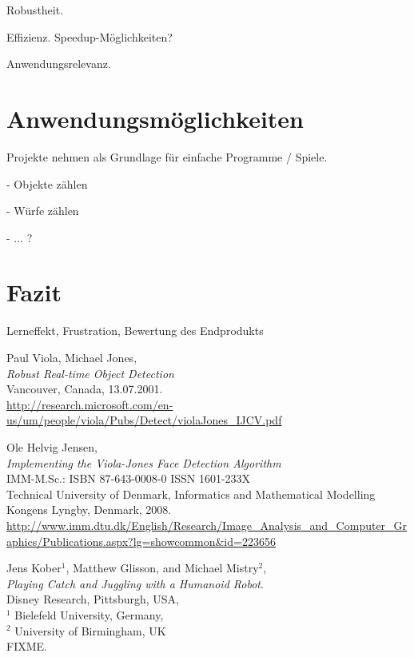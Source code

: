 \documentclass[12pt,a4paper,ngerman]{scrartcl}
\begin{document}
Robustheit.

Effizienz. Speedup-Möglichkeiten?

Anwendungsrelevanz.

\section{Anwendungsmöglichkeiten}

Projekte nehmen als Grundlage für einfache Programme / Spiele.

- Objekte zählen

- Würfe zählen

- ... ?

\section{Fazit}

Lerneffekt, Frustration, Bewertung des Endprodukts


\newpage



\newpage
{}
{}
\renewcommand{\refname}{Quellen}

\begin{thebibliography}{99}

Paul Viola, Michael Jones,\\
{\em Robust Real-time Object Detection}\\
Vancouver, Canada, 13.07.2001.\\
\url{http://research.microsoft.com/en-us/um/people/viola/Pubs/Detect/violaJones_IJCV.pdf}

Ole Helvig Jensen,\\
{\em Implementing the Viola-Jones Face Detection Algorithm}\\
IMM-M.Sc.: ISBN 87-643-0008-0 \qquad ISSN 1601-233X\\
Technical University of Denmark, Informatics and Mathematical Modelling\\
Kongens Lyngby, Denmark, 2008.\\
\url{http://www.imm.dtu.dk/English/Research/Image_Analysis_and_Computer_Graphics/Publications.aspx?lg=showcommon&id=223656}

Jens Kober$^{1}$, Matthew Glisson, and Michael Mistry$^{2}$,\\
{\em Playing Catch and Juggling with a Humanoid Robot}.\\
Disney Research, Pittsburgh, USA,\\
$^{1}$ Bielefeld University, Germany,\\
$^{2}$ University of Birmingham, UK\\
FIXME.

\end{thebibliography}
\end{document}

